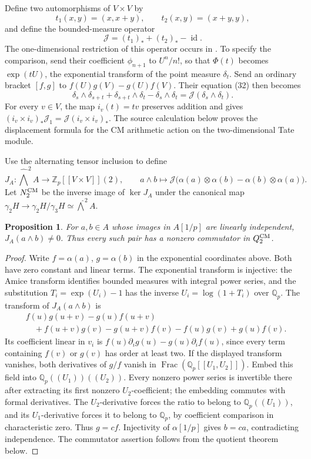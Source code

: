 \documentclass[11pt]{article}
\newtheorem{proposition}[theorem]{Proposition}
\theoremstyle{definition}\newtheorem{definition}[theorem]{Definition}
\begin{document}
Define two automorphisms of \(V\times V\) by
\[
 t_1(x,y)=(x,x+y),\qquad t_2(x,y)=(x+y,y),
\]
and define the bounded-measure operator
\[
 \mathcal J=(t_1)_*+(t_2)_*-\operatorname{id}.
\]
The one-dimensional restriction of this operator occurs in
\cite[equations (29) and (32), p.~233]{LuqueNovelliThibon}.
To specify the comparison, send their coefficient
\(\phi_{n+1}\) to \(U^n/n!\), so that
\(\Phi(t)\) becomes \(\exp(tU)\), the exponential transform
of the point measure \(\delta_t\). Send an ordinary bracket
\([f,g]\) to \(f(U)g(V)-g(U)f(V)\). Their equation (32)
then becomes
\[
 \delta_s\wedge\delta_{s+t}
 +\delta_{s+t}\wedge\delta_t-\delta_s\wedge\delta_t
                 =\mathcal J(\delta_s\wedge\delta_t).
\]
For every \(v\in V\), the map \(i_v(t)=tv\) preserves
addition and gives
\((i_v\times i_v)_*\mathcal J_1
 =\mathcal J(i_v\times i_v)_*\).
The source calculation below proves the displacement formula
for the CM arithmetic action on the two-dimensional Tate module.

Use the alternating tensor inclusion to define
\[
 J_A:\widehat{\bigwedge}^2 A
 \longrightarrow\mathbb Z_p[[V\times V]](2),\qquad
 a\wedge b\longmapsto
 \mathcal J\bigl(\alpha(a)\otimes\alpha(b)
                         -\alpha(b)\otimes\alpha(a)\bigr).
\]
Let \(N_2^{\rm CM}\) be the inverse image of
\(\ker J_A\) under the canonical map
\(\gamma_2H\to\gamma_2H/\gamma_3H
 \simeq\widehat{\bigwedge}^2A\).

\begin{proposition}\label{prop:cm-decomposable-commutators}
For \(a,b\in A\) whose images in \(A[1/p]\) are linearly
independent, \(J_A(a\wedge b)\ne0\). Thus every such pair
has a nonzero commutator in \(Q_2^{\rm CM}\).
\end{proposition}
\begin{proof}
Write \(f=\alpha(a)\), \(g=\alpha(b)\) in the exponential
coordinates above. Both have zero constant and linear terms.
The exponential transform is injective: the Amice transform
identifies bounded measures with integral power series, and
the substitution \(T_i=\exp(U_i)-1\) has the inverse
\(U_i=\log(1+T_i)\) over \(\mathbb Q_p\).
The transform of \(J_A(a\wedge b)\) is
\begin{align*}
 &f(u)g(u+v)-g(u)f(u+v)\\
 &\quad+f(u+v)g(v)-g(u+v)f(v)-f(u)g(v)+g(u)f(v).
\end{align*}
Its coefficient linear in \(v_i\) is
\(f(u)\partial_i g(u)-g(u)\partial_i f(u)\), since every
term containing \(f(v)\) or \(g(v)\) has order at least two.
If the displayed transform vanishes, both derivatives of
\(g/f\) vanish in \(\operatorname{Frac}(\mathbb Q_p[[U_1,U_2]])\).
Embed this field into \(\mathbb Q_p((U_1))((U_2))\).
Every nonzero power series is invertible there after extracting
its first nonzero \(U_2\)-coefficient; the embedding commutes
with formal derivatives. The \(U_2\)-derivative forces the
ratio to belong to \(\mathbb Q_p((U_1))\), and its
\(U_1\)-derivative forces it to belong to \(\mathbb Q_p\),
by coefficient comparison in characteristic zero. Thus
\(g=cf\). Injectivity of \(\alpha[1/p]\) gives \(b=ca\),
contradicting independence. The commutator assertion follows
from the quotient theorem below.
\end{proof}
\end{document}
